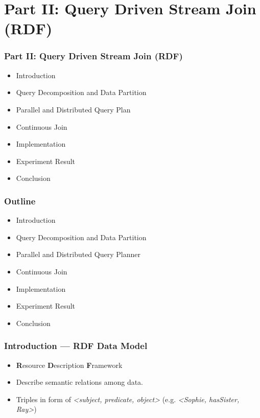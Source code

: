 \section{Part II: Query Driven Stream Join (RDF)}





\begin{frame}
\frametitle{Part II: Query Driven Stream Join (RDF)}
	\begin{itemize}
		\item Introduction
		\item Query Decomposition and Data Partition
		\item Parallel and Distributed Query Plan
		\item Continuous Join
		\item Implementation
		\item Experiment Result
		\item Conclusion
	\end{itemize}
\end{frame}


\begin{frame}
\frametitle{Outline}
	\begin{itemize}
		\item Introduction
		\item \textcolor{blue!20}{Query Decomposition and Data Partition}
		\item \textcolor{blue!20}{Parallel and Distributed Query Planner}
		\item \textcolor{blue!20}{Continuous Join}
		\item \textcolor{blue!20}{Implementation}
		\item \textcolor{blue!20}{Experiment Result}
		\item \textcolor{blue!20}{Conclusion}
	\end{itemize}
\end{frame}

\begin{frame}
\frametitle{Introduction --- RDF Data Model}
\begin{itemize}
\item \textbf{R}esource \textbf{D}escription \textbf{F}ramework 
\item Describe semantic relations among data.
\item Triples in form of \emph{<subject, predicate, object>} 
(e.g. \emph{<Sophie, hasSister, Ray>})

\end{itemize}
\end{frame}

